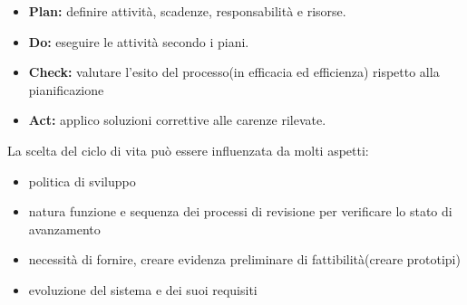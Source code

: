 \begin{itemize}

	\item \textbf{Plan:} definire attività, scadenze, responsabilità e risorse.
	\item \textbf{Do:} eseguire le attività secondo i piani.
	\item \textbf{Check:} valutare l'esito del processo(in efficacia ed efficienza) rispetto alla pianificazione
	\item \textbf{Act:} applico soluzioni correttive alle carenze rilevate.

\end{itemize}
La scelta del ciclo di vita può essere influenzata da molti aspetti:
\begin{itemize}
	\item politica di sviluppo
	\item natura funzione e sequenza dei processi di revisione per verificare lo stato di avanzamento
	\item necessità di fornire, creare evidenza preliminare di fattibilità(creare prototipi)
	\item evoluzione del sistema e dei suoi requisiti
\end{itemize}


